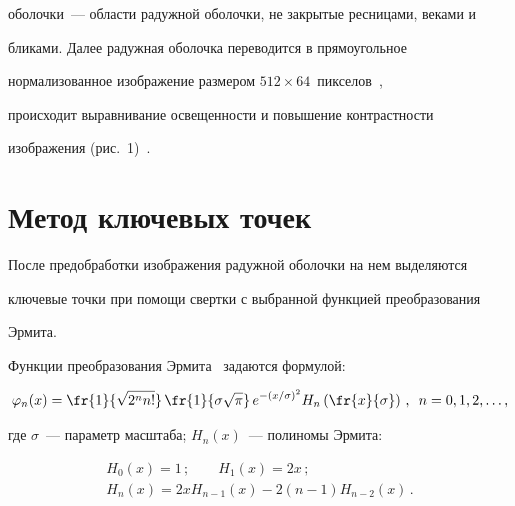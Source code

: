 оболочки~--- области радужной оболочки, не закрытые ресницами, веками и 


бликами. Далее радужная оболочка переводится в прямоугольное 


нормализованное изображение размером $512\times64$~пикселов~\cite{4-pav}, 


происходит выравнивание освещенности и повышение контрастности 


изображения (рис.~1)~\cite{8-pav}.











\section{Метод ключевых точек}





После предобработки изображения радужной оболочки на нем выделяются 


ключевые точки при помощи свертки с выбранной функцией преобразования 


Эрмита.





Функции преобразования Эрмита~\cite{9-pav} задаются формулой:


$$


\varphi_n(x)=\fr{1}{\sqrt{2^n  n!}}\,\fr{1}{\sigma\sqrt{\pi}}\, 


e^{-(x/\sigma)^2} H_n\left( \fr{x}{\sigma}\right)\,,\enskip n=0,1,2,\ldots , 


$$


где $\sigma$~--- параметр масштаба; $H_n(x)$~--- полиномы Эрмита:


\begin{gather*}


H_0(x)=1\,;\qquad H_1(x)=2 x\,;\\


H_n(x)=2 x  H_{n-1}(x)-2 (n-1) H_{n-2}(x)\,.


\end{gather*}





